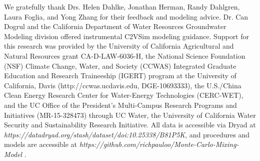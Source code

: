 We gratefully thank Drs. Helen Dahlke, Jonathan Herman, Randy Dahlgren, Laura Foglia, and Yong Zhang for their feedback and modeling advice. Dr. Can Dogrul and the California Department of Water Resources Groundwater Modeling division offered instrumental C2VSim modeling guidance. Support for this research was provided by the University of California Agricultural and Natural Resources grant CA-D-LAW-6036-H, the National Science Foundation (NSF) Climate Change, Water, and Society (CCWAS) Integrated Graduate Education and Research Traineeship (IGERT) program at the University of California, Davis (http://ccwas.ucdavis.edu, DGE-10693333), the U.S./China Clean Energy Research Center for Water-Energy Technologies (CERC-WET), and
the UC Office of the President’s Multi-Campus Research Programs and
Initiatives (MR-15-328473) through UC Water, the University of
California Water Security and Sustainability Research Initiative. All data is accessible via Dryad at \textit{https://datadryad.org/stash/dataset/doi:10.25338/B81P5K}, and procedures and models are accessible at \textit{https://github.com/richpauloo/Monte-Carlo-Mixing-Model} \citep{Pauloo2020}.  

\clearpage
